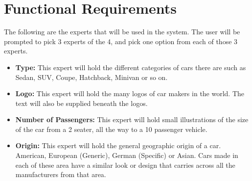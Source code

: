 \documentclass[12pt]{article}
\begin{document}
\section{Functional Requirements}
The following are the experts that will be used in the system. The user will be prompted to pick 3 experts of the 4, and pick one option from each of those 3 experts.
\begin{itemize}
	\item \textbf{Type:} This expert will hold the different categories of cars there are such as Sedan, SUV, Coupe, Hatchback, Minivan or so on.
	\item \textbf{Logo:} This expert will hold the many logos of car makers in the world. The text will also be supplied beneath the logos.
	\item \textbf{Number of Passengers:} This expert will hold small illustrations of the size of the car from a 2 seater, all the way to a 10 passenger vehicle.
	\item \textbf{Origin:} This expert will hold the general geographic origin of a car. American, European (Generic), German (Specific) or Asian. Cars made in each of these area have a similar look or design that carries across all the manufacturers from that area.
\end{itemize}
\end{document}
